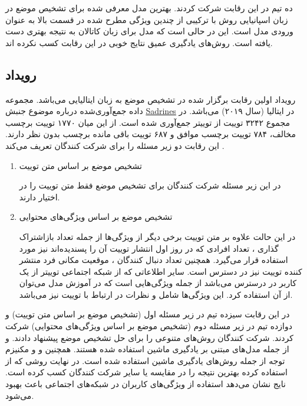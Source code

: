    ده تیم در این رقابت شرکت کردند. بهترین مدل معرفی شده برای تشخیص موضع در زبان اسپانیایی روش
     با ترکیبی از چندین ویژگی مطرح شده در قسمت بالا به عنوان ورودی مدل است. این در حالی است که مدل 
     برای زبان کاتالان به نتیجه بهتری دست یافته است. روش‌های یادگیری عمیق نتایج خوبی در این رقابت کسب نکردە اند.
   
\subsection{رویداد
	}
رویداد  
اولین رقابت برگزار شده در تشخیص موضع به زبان ایتالیایی می‌باشد.
مجموعه داده جمع‌آوری‌شده درباره موضوع جنبش
\href{https://en.wikipedia.org/wiki/Sardines_movement}{Sadrines}
در ایتالیا (سال ۲۰۱۹) می‌باشد. در مجموع ۳۲۴۲ توییت از توییتر جمع‌آوری شده است. از این میان ۱۷۷۰ توییت برچسب مخالف، ۷۸۴ توییت برچسب موافق و ۶۸۷ توییت باقی مانده برچسب بدون نظر دارند. این رقابت دو زیر مسئله را برای شرکت کنندگان تعریف می‌کند \cite{cignarella2020sardistance}.
\begin{enumerate}
	\item تشخیص موضع بر اساس متن توییت
	
	در این زیر مسئله شرکت کنندگان برای تشخیص موضع فقط متن توییت را در اختیار دارند.

	\item تشخیص موضع بر اساس ویژگی‌های محتوایی
	
	در این حالت علاوه بر متن توییت برخی دیگر از ویژگی‌ها از جمله تعداد بازاشتراک گذاری
	،
	تعداد افرادی که در روز اول انتشار توییت آن را پسندیدە‌اند نیز مورد استفاده قرار می‌گیرد. همچنین تعداد دنبال کنندگان
	،
	موقعیت مکانی فرد منتشر کننده توییت نیز در دسترس است. سایر اطلاعاتی که از شبکه اجتماعی توییتر از یک کاربر در درسترس می‌باشد از جمله ویژگی‌هایی است که در آموزش	مدل می‌توان از آن استفاده کرد. این ویژگی‌ها شامل
	  و نظرات در ارتباط با توییت نیز می‌باشد.
\end{enumerate}

در این رقابت سیزده تیم در زیر مسئله اول (تشخیص موضع بر اساس متن توییت) و دوازده تیم در زیر مسئله دوم (تشخیص موضع بر اساس ویژگی‌های محتوایی) شرکت کردند. شرکت کنندگان روش‌های متنوعی را برای حل تشخیص موضع پیشنهاد دادند.
و
از جمله مدل‌های مبتنی بر یادگیری ماشین استفاده شده هستند. همچنین
و
و مکنیزم توجه از جمله روش‌های یادگیری ماشین استفاده شده است. در نهایت روشی که از 
 \cite{kenton2019bert}
استفاده کرده بهترین نتیجه را در مقایسه یا سایر شرکت کنندگان کسب کرده است. نایج نشان می‌دهد استفاده از ویژگی‌های کاربران در شبکە‌های اجتماعی باعث بهبود
 می‌شود.

